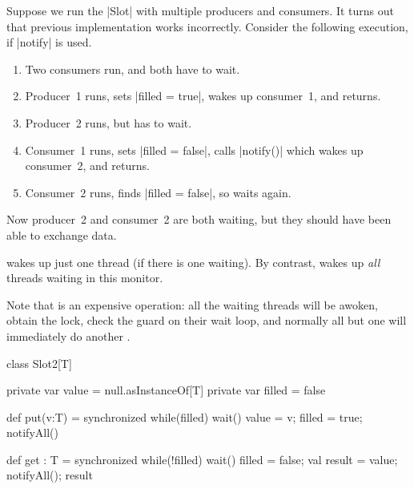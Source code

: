 \begin{slide}

Suppose we run the |Slot| with multiple producers and consumers.  It turns out
that previous implementation works incorrectly.
%
Consider the following execution, if |notify| is used.
%
\begin{enumerate}
\item Two consumers run, and both have to wait.

\item Producer~1 runs, sets |filled = true|, wakes up consumer~1, and returns.

\item Producer~2 runs, but has to wait.

\item Consumer~1 runs, sets |filled = false|, calls |notify()| which wakes up
consumer~2, and returns.

\item Consumer~2 runs, finds |filled = false|, so waits again. 
\end{enumerate}
%
Now producer~2 and consumer~2 are both waiting, but they should have been able
to exchange data. 

\end{slide}


\begin{slide}


 wakes up just one thread (if there is one waiting).  By
contrast,  wakes up \emph{all} threads waiting in this
monitor. 

Note that  is an expensive operation: all the waiting
threads will be awoken, obtain the lock, check the guard on their wait loop,
and normally all but one will immediately do another .
\end{slide}


\begin{slide}

\begin{scala}
class Slot2[T]{
  private var value = null.asInstanceOf[T]
  private var filled = false

  def put(v:T) = synchronized{
    while(filled) wait()
    value = v; filled = true; notifyAll()
  }

  def get : T = synchronized{
    while(!filled) wait()
    filled = false; val result = value; notifyAll(); result
  }
}
\end{scala}
%
\end{slide}

